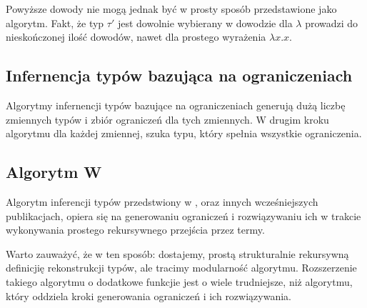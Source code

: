 \documentclass{article}
\begin{document}
Powyższe dowody nie mogą jednak być w prosty sposób przedstawione jako algorytm. Fakt, że typ $\tau'$ jest dowolnie wybierany w dowodzie dla $\lambda$ prowadzi do nieskończonej ilość dowodów, nawet dla prostego wyrażenia $\lambda x.x$.
\subsection{Infernencja typów bazująca na ograniczeniach}
Algorytmy infernencji typów bazujące na ograniczeniach generują dużą liczbę zmiennych typów i zbiór ograniczeń dla tych zmiennych. W drugim kroku algorytmu dla każdej zmiennej, szuka typu, który spełnia wszystkie ograniczenia.
\subsection{Algorytm W}
Algorytm inferencji typów przedstwiony w \cite{Milner__1978}, oraz innych wcześniejszych publikacjach, opiera się na generowaniu ograniczeń i rozwiązywaniu ich w trakcie wykonywania prostego rekursywnego przejścia przez termy.

Warto zauważyć, że w ten sposób: dostajemy, prostą strukturalnie rekursywną definicjię rekonstrukcji typów, ale tracimy modularność algorytmu. Rozszerzenie takiego algorytmu o dodatkowe funkcjie jest o wiele trudniejsze, niż algorytmu, który oddziela kroki generowania ograniczeń i ich rozwiązywania.
\end{document}
